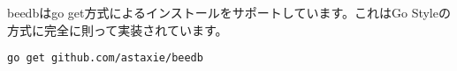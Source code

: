 beedbはgo get方式によるインストールをサポートしています。これはGo Styleの方式に完全に則って実装されています。

\begin{lstlisting}[numbers=none]
go get github.com/astaxie/beedb
\end{lstlisting}
